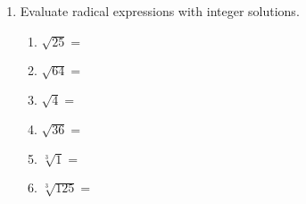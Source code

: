 \documentclass[12pt, twoside]{article}
\begin{document}
\begin{enumerate}[itemsep=0.5cm]
\item Evaluate radical expressions with integer solutions.
    \begin{multicols}{2}
    \begin{enumerate}[itemsep=0.5cm]
        \item $\sqrt{25}=$
        \item $\sqrt{64}=$
        \item $\sqrt{4}=$
        \item $\sqrt{36}=$
        \item $\sqrt[3]{1}=$
        \item $\sqrt[3]{125}=$
    \end{enumerate}
    \end{multicols}

\end{enumerate}
\end{document}
